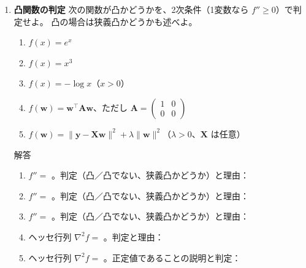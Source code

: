 \documentclass[a4paper,dvipdfmx]{jsarticle}
\newcommand{\提出期限}{2026年10月26日（月）}
\newcommand{\学籍番号}{0000000}
\newcommand{\氏名}{氏名を書く}
\newcommand{\提出日}{2026年10月26日}
\newenvironment{answer}{\begin{itembox}[l]{解答}}{\end{itembox}}
\begin{document}
\begin{enumerate}
  \item \textbf{凸関数の判定}\quad
    次の関数が凸かどうかを、2次条件（1変数なら $f'' \geq 0$）で判定せよ。
    凸の場合は狭義凸かどうかも述べよ。
    \begin{enumerate}
      \item $f(x) = e^x$
      \item $f(x) = x^3$
      \item $f(x) = -\log x$（$x > 0$）
      \item $f(\bm{w}) = \bm{w}^\top\bm{A}\bm{w}$、ただし $\bm{A} = \begin{pmatrix} 1 & 0 \\ 0 & 0 \end{pmatrix}$
      \item $f(\bm{w}) = \|\bm{y} - \bm{X}\bm{w}\|^2 + \lambda\|\bm{w}\|^2$（$\lambda > 0$、$\bm{X}$ は任意）
    \end{enumerate}
    \begin{answer}
      \begin{enumerate}
        \item $f'' = $ \phantom{XXXXXXXX}。判定（凸／凸でない、狭義凸かどうか）と理由：
          \vspace{6mm}
        \item $f'' = $ \phantom{XXXXXXXX}。判定（凸／凸でない、狭義凸かどうか）と理由：
          \vspace{6mm}
        \item $f'' = $ \phantom{XXXXXXXX}。判定（凸／凸でない、狭義凸かどうか）と理由：
          \vspace{6mm}
        \item ヘッセ行列 $\nabla^2 f = $ \phantom{XXXXXXXX}。判定と理由：
          \vspace{8mm}
        \item ヘッセ行列 $\nabla^2 f = $ \phantom{XXXXXXXX}。正定値であることの説明と判定：
          \vspace{12mm}
      \end{enumerate}
    \end{answer}


\end{enumerate}
\end{document}
